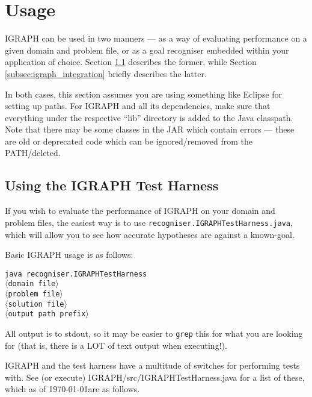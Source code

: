 \documentclass[10pt,a4paper]{article}
\begin{document}
\begin{sloppypar}
\section{Usage}

\textsc{IGRAPH} can be used in two manners --- as a way of evaluating performance on a given domain and problem file, or as a goal recogniser embedded within your application of choice. Section \ref{subsec:igraph_tet_harness} describes the former, while Section \ref{subsec:igraph_integration} briefly describes the latter.

In both cases, this section assumes you are using something like Eclipse for setting up paths. For \textsc{IGRAPH} and all its dependencies, make sure that everything under the respective ``lib'' directory is added to the Java classpath. Note that there may be some classes in the JAR which contain errors --- these are old or deprecated code which can be ignored/removed from the PATH/deleted.

\subsection{Using the \textsc{IGRAPH} Test Harness}
\label{subsec:igraph_tet_harness}

If you wish to evaluate the performance of \textsc{IGRAPH} on your domain and problem files, the easiest way is to use \texttt{recogniser.IGRAPHTestHarness.java}, which will allow you to see how accurate hypotheses are against a known-goal.

Basic \textsc{IGRAPH} usage is as follows:

\texttt{java recogniser.IGRAPHTestHarness \\
\indent\indent$\langle$domain file$\rangle$ \\
\indent\indent$\langle$problem file$\rangle$ \\
\indent\indent$\langle$solution file$\rangle$ \\
\indent\indent$\langle$output path prefix$\rangle$}

All output is to stdout, so it may be easier to \texttt{grep} this for what you are looking for (that is, there is a LOT of text output when executing!).

\textsc{IGRAPH} and the test harness have a multitude of switches for performing tests with. See (or execute) IGRAPH/src/IGRAPHTestHarness.java for a list of these, which as of \today are as follows.


\end{sloppypar}
\end{document}
